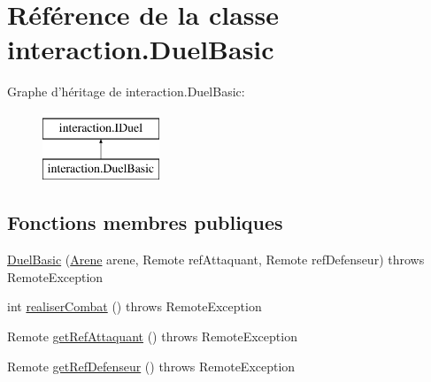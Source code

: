\hypertarget{classinteraction_1_1_duel_basic}{\section{Référence de la classe interaction.\-Duel\-Basic}
\label{classinteraction_1_1_duel_basic}
}
Graphe d'héritage de interaction.\-Duel\-Basic\-:\begin{figure}[H]
\begin{center}
\leavevmode
\includegraphics[height=2.000000cm]{classinteraction_1_1_duel_basic}
\end{center}
\end{figure}
\subsection*{Fonctions membres publiques}
\begin{DoxyCompactItemize}
\item 
\hyperlink{classinteraction_1_1_duel_basic_afafe5b66524270a5acf3c855e896444e}{Duel\-Basic} (\hyperlink{classserveur_1_1_arene}{Arene} arene, Remote ref\-Attaquant, Remote ref\-Defenseur)  throws Remote\-Exception
\item 
int \hyperlink{classinteraction_1_1_duel_basic_a88b42733ab5e32f5334f1c590a6dcd72}{realiser\-Combat} ()  throws Remote\-Exception 
\item 
Remote \hyperlink{classinteraction_1_1_duel_basic_a406cd53e1eb8b51d99bbe8af72fb28d0}{get\-Ref\-Attaquant} ()  throws Remote\-Exception 
\item 
Remote \hyperlink{classinteraction_1_1_duel_basic_a6e7e4b0163230f13aad5ca285f969b6f}{get\-Ref\-Defenseur} ()  throws Remote\-Exception 
\end{DoxyCompactItemize}


